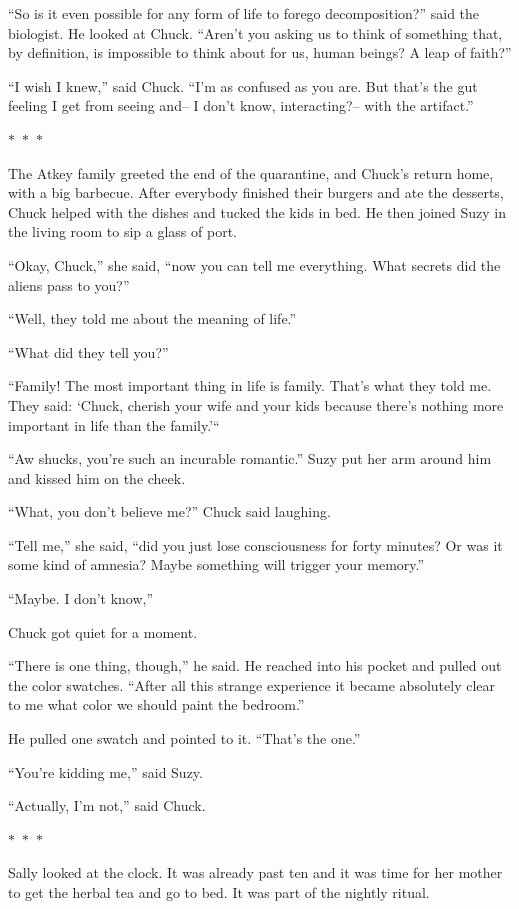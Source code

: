 \documentclass{memoir}
\newcommand{\starbreak}{%
\begin{center}
  $\ast$~$\ast$~$\ast$
\end{center}
}
\begin{document}
``So is it even possible for any form of life to forego decomposition?'' said the biologist. He looked at Chuck. ``Aren't you asking us to think of something that, by definition, is impossible to think about for us, human beings? A leap of faith?''

``I wish I knew,'' said Chuck. ``I'm as confused as you are. But that's the gut feeling I get from seeing and-- I don't know, interacting?-- with the artifact.''


\starbreak

The Atkey family greeted the end of the quarantine, and Chuck's return home, with a big barbecue. After everybody finished their burgers and ate the desserts, Chuck helped with the dishes and tucked the kids in bed. He then joined Suzy in the living room to sip a glass of port. 

``Okay, Chuck,'' she said, ``now you can tell me everything. What secrets did the aliens pass to you?''

``Well, they told me about the meaning of life.''

``What did they tell you?''

``Family! The most important thing in life is family. That's what they told me. They said: `Chuck, cherish your wife and your kids because there's nothing more important in life than the family.'``

``Aw shucks, you're such an incurable romantic.'' Suzy put her arm around him and kissed him on the cheek.

``What, you don't believe me?'' Chuck said laughing.

``Tell me,'' she said, ``did you just lose consciousness for forty minutes? Or was it some kind of amnesia? Maybe something will trigger your memory.''

``Maybe. I don't know,'' 

Chuck got quiet for a moment. 

``There is one thing, though,'' he said. He reached into his pocket and pulled out the color swatches. ``After all this strange experience it became absolutely clear to me what color we should paint the bedroom.'' 

He pulled one swatch and pointed to it. ``That's the one.''

``You're kidding me,'' said Suzy.

``Actually, I'm not,'' said Chuck.

\starbreak

Sally looked at the clock. It was already past ten and it was time for her mother to get the herbal tea and go to bed. It was part of the nightly ritual.
\end{document}
